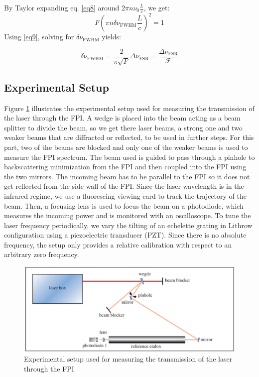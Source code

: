 \documentclass[12pt]{article}
\begin{document}
By Taylor expanding eq. \ref{eq8} around
$2 \pi n \nu_0 \frac{L}{c}$, we get:
\begin{equation}
    F\left(\pi n \delta \nu_{\mathrm{FWHM}} \frac{L}{c}\right)^2=1
    \label{eq9}
\end{equation}
Using \ref{eq9}, solving for  $\delta \nu_{\mathrm{FWHM}}$ yields:

\begin{equation}
    \delta \nu_{\mathrm{FWHM}}=\frac{2}{\pi \sqrt{F}} \Delta \nu_{\mathrm{FSR}}=\frac{\Delta \nu_{\mathrm{FSR}}}{\mathcal{F}}
    \label{eq10}
\end{equation}

\subsection{Experimental Setup}
Figure \ref{fig4} illustrates the experimental setup used for measuring the transmission of the laser through the FPI. A wedge is placed into the beam acting as a beam splitter to divide the beam, so we get there laser beams, a strong one and two weaker beams that are diffracted or reflected, to be used in further steps. For this part, two of the beams are blocked and only one of the weaker beams is used to measure the FPI spectrum.  
The beam used is guided to pass through a pinhole to backscattering minimization from the FPI and then coupled into the FPI using the two mirrors. The incoming beam has to be parallel to the FPI so it does not get reflected from the side wall of the FPI. Since the laser wavelength is in the infrared regime, we use a fluorescing viewing card to track the trajectory of the beam. 
Then, a focusing lens is used to focus the beam on a photodiode, which measures the incoming power and is monitored with an oscilloscope. 
To tune the laser frequency periodically, we vary the tilting of an echelette grating in Lithrow configuration using a piezoelectric transducer (PZT). Since there is no absolute frequency, the setup only provides a relative calibration with respect to an arbitrary zero frequency.

\begin{figure}[H]
    \centering
    \includegraphics[width = \textwidth]{fig/setup2.jpg}
    \caption{Experimental setup used for measuring the transmission of the laser through the FPI \cite{lecturenote}}
    \label{fig4}
\end{figure}
\end{document}
